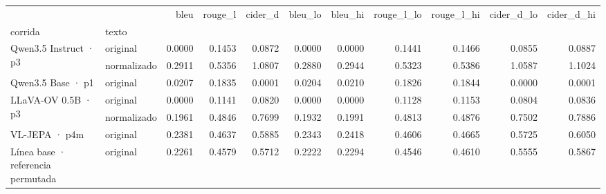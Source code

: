 \begin{tabular}{llrrrrrrrrr}
\toprule
 &  & bleu & rouge\_l & cider\_d & bleu\_lo & bleu\_hi & rouge\_l\_lo & rouge\_l\_hi & cider\_d\_lo & cider\_d\_hi \\
corrida & texto &  &  &  &  &  &  &  &  &  \\
\midrule
\multirow[t]{2}{*}{Qwen3.5 Instruct · p3} & original & 0.0000 & 0.1453 & 0.0872 & 0.0000 & 0.0000 & 0.1441 & 0.1466 & 0.0855 & 0.0887 \\
 & normalizado & 0.2911 & 0.5356 & 1.0807 & 0.2880 & 0.2944 & 0.5323 & 0.5386 & 1.0587 & 1.1024 \\
\cline{1-11}
Qwen3.5 Base · p1 & original & 0.0207 & 0.1835 & 0.0001 & 0.0204 & 0.0210 & 0.1826 & 0.1844 & 0.0000 & 0.0001 \\
\cline{1-11}
\multirow[t]{2}{*}{LLaVA-OV 0.5B · p3} & original & 0.0000 & 0.1141 & 0.0820 & 0.0000 & 0.0000 & 0.1128 & 0.1153 & 0.0804 & 0.0836 \\
 & normalizado & 0.1961 & 0.4846 & 0.7699 & 0.1932 & 0.1991 & 0.4813 & 0.4876 & 0.7502 & 0.7886 \\
\cline{1-11}
VL-JEPA · p4m & original & 0.2381 & 0.4637 & 0.5885 & 0.2343 & 0.2418 & 0.4606 & 0.4665 & 0.5725 & 0.6050 \\
\cline{1-11}
Línea base · referencia permutada & original & 0.2261 & 0.4579 & 0.5712 & 0.2222 & 0.2294 & 0.4546 & 0.4610 & 0.5555 & 0.5867 \\
\cline{1-11}
\bottomrule
\end{tabular}
